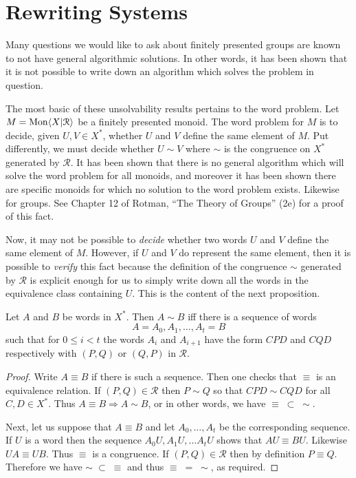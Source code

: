 
\section{Rewriting Systems}

\begin{ap} Many questions we would like to ask about finitely presented groups
    are known to not have general algorithmic solutions. In other words, it has
    been shown that it is not possible to write down an algorithm which solves
    the problem in question.

    The most basic of these unsolvability results pertains to the word problem.
    Let $M = \mathrm{Mon}\langle X|\mathcal{R}\rangle$ be a finitely presented monoid. The word
    problem for $M$ is to decide, given $U,V\in X^*$, whether $U$ and $V$
    define the same element of $M$. Put differently, we must decide whether $U
    \sim V$ where $\sim$ is the congruence on $X^*$ generated by $\mathcal{R}$.
    It has been shown that there is no general algorithm which will solve the
    word problem for all monoids, and moreover it has been shown there are
    specific monoids for which no solution to the word problem exists. Likewise
    for groups. See Chapter 12 of Rotman, ``The Theory of Groups'' (2e) for a
    proof of this fact.

    Now, it may not be possible to \emph{decide} whether two words $U$ and $V$
    define the same element of $M$. However, if $U$ and $V$ do represent the
    same element, then it is possible to \emph{verify} this fact because the
    definition of the congruence $\sim$ generated by $\mathcal{R}$ is explicit
    enough for us to simply write down all the words in the equivalence class
    containing $U$. This is the content of the next proposition.
\end{ap}

\begin{prop} Let $A$ and $B$ be words in $X^*$. Then $A\sim B$ iff there is a
    sequence of words \[A = A_0, A_1, \dots, A_t = B\] such that for $0 \le i <
    t$ the words $A_i$ and $A_{i+1}$ have the form $CPD$ and $CQD$ respectively
    with $(P,Q)$ or $(Q,P)$ in $\mathcal{R}$.
\end{prop}
\begin{proof} Write $A\equiv B$ if there is such a sequence. Then one checks
    that $\equiv$ is an equivalence relation. If $(P,Q)\in \mathcal{R}$ then
    $P\sim Q$ so that $CPD \sim CQD$ for all $C,D\in X^*$. Thus $A\equiv B
    \Rightarrow A \sim B$, or in other words, we have $\equiv\; \subset\;
    \sim$.

    Next, let us suppose that $A\equiv B$ and let $A_0,\dots, A_t$ be the
    corresponding sequence. If $U$ is a word then the sequence $A_0U, A_1U,
    \dots A_tU$ shows that $AU \equiv BU$. Likewise $UA \equiv UB$. Thus
    $\equiv$ is a congruence. If $(P,Q)\in \mathcal{R}$ then by definition
    $P\equiv Q$. Therefore we have $\sim\; \subset \;\equiv$ and thus $\equiv\;
    =\; \sim$, as required.
\end{proof}

